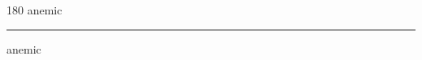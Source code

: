 
\begin{frame}
\begin{center}
\begin{turn}{180}
{\fontsize{2.5cm}{1em}\selectfont anemic}
\end{turn}
\vspace{1em}\par  
\hrule
\vspace{1em}\par  
{\fontsize{2.5cm}{1em}\selectfont anemic}
\end{center}
\end{frame}
